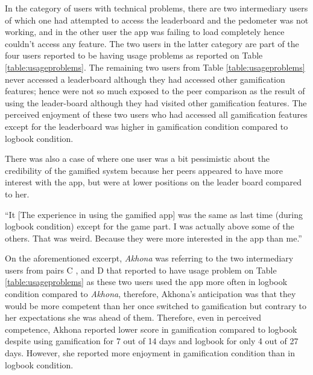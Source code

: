 In the category of users with technical problems, there are two intermediary users of which one had attempted to access  the leaderboard and the pedometer was not working, and in the other user the app was failing to load completely hence couldn't access any feature. The two users in the latter category are part of the four users reported to be having usage problems as reported on Table \ref{table:usageproblems}. The remaining two users from Table \ref{table:usageproblems} never accessed a leaderboard although they had accessed other gamification features; hence were not so much exposed to the peer comparison as the result of using the leader-board although they had visited other gamification features. The perceived enjoyment of these two users who had accessed all gamification features except for the leaderboard was higher in gamification condition compared to logbook condition.    

There was also a case of where one user was a bit pessimistic about the credibility of the gamified system because her peers appeared to have more interest with the app, but were at lower positions on the leader board compared to her. 

 {``It [The experience in using the gamified app] was the same as last time (during logbook condition) except for the game part. I was actually above some of the others. That was weird. Because they were more interested in the app than me.''} 

On the aforementioned excerpt, \emph{Akhona} was referring to the two intermediary users from pairs C , and D that reported to have usage problem on Table \ref{table:usageproblems} as these two users used the app more often in logbook condition compared to \emph{Akhona}, therefore, Akhona's anticipation was that they would be more competent than her once switched to gamification but contrary to her expectations she was ahead of them.  Therefore, even in perceived competence, Akhona reported lower score in gamification compared to logbook despite using gamification for 7 out of 14 days and logbook for only 4 out of 27 days. However, she reported more enjoyment in gamification condition than in logbook condition.

